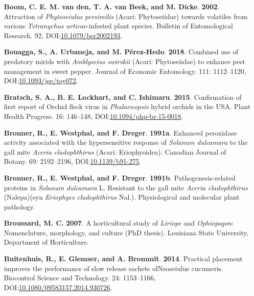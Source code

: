 \documentclass[12pt,final,CPage]{ufthesis}
\newlength{\cslhangindent}
\newenvironment{CSLReferences}[2] %
{%
	\setlength{\parindent}{0pt}
	\ifodd #1 \everypar{\setlength{\hangindent}{\cslhangindent}}\ignorespaces\fi
	\ifnum #2 > 0
	\setlength{\parskip}{#2\baselineskip}
	\fi
}%
{}
\begin{document}
{\begin{CSLReferences}{1}{0}
  \leavevmode{}%
  \textbf{Boom, C. E. M. van den, T. A. van Beek, and M. Dicke}. \textbf{2002}. Attraction of {\emph{Phytoseiulus persimilis}} ({Acari}: {Phytoseiidae}) towards volatiles from various {\emph{Tetranychus urticae}}-infested plant species. Bulletin of Entomological Research. 92, DOI:\href{https://doi.org/10.1079/ber2002193}{10.1079/ber2002193}.

  \leavevmode{}%
  \textbf{Bouagga, S., A. Urbaneja, and M. Pérez-Hedo}. \textbf{2018}. Combined use of predatory mirids with {\emph{Amblyseius swirskii}} ({Acari}: {Phytoseiidae}) to enhance pest management in sweet pepper. Journal of Economic Entomology. 111: 1112--1120, DOI:\href{https://doi.org/10.1093/jee/toy072}{10.1093/jee/toy072}.

  \leavevmode{}%
  \textbf{Bratsch, S. A., B. E. Lockhart, and C. Ishimaru}. \textbf{2015}. Confirmation of first report of {Orchid fleck virus} in {\emph{Phalaenopsis}} hybrid orchids in the {USA}. Plant Health Progress. 16: 146--148, DOI:\href{https://doi.org/10.1094/php-br-15-0018}{10.1094/php-br-15-0018}.

  \leavevmode{}%
  \textbf{Bronner, R., E. Westphal, and F. Dreger}. \textbf{1991a}. Enhanced peroxidase activity associated with the hypersensitive response of {\emph{Solanum dulcamara}} to the gall mite {\emph{Aceria cladophthirus}} ({Acari}: {Eriophyoidea}). Canadian Journal of Botany. 69: 2192--2196, DOI:\href{https://doi.org/10.1139/b91-275}{10.1139/b91-275}.

  \leavevmode{}%
  \textbf{Bronner, R., E. Westphal, and F. Dreger}. \textbf{1991b}. Pathogenesis-related proteins in {\emph{Solanum dulcamara}} {L.} Resistant to the gall mite {\emph{Aceria cladophthirus}} ({Nalepa})(syn {\emph{Eriophyes cladophthirus}} {Nal.}). Physiological and molecular plant pathology.

  \leavevmode{}%
  \textbf{Broussard, M. C.} \textbf{2007}. A horticultural study of {\emph{Liriope}} and {\emph{Ophiopogon}}: Nomenclature, morphology, and culture (PhD thesis). Louisiana State University, Department of Horticulture.

  \leavevmode{}%
  \textbf{Buitenhuis, R., E. Glemser, and A. Brommit}. \textbf{2014}. Practical placement improves the performance of slow release sachets {ofNeoseiulus} cucumeris. Biocontrol Science and Technology. 24: 1153--1166, DOI:\href{https://doi.org/10.1080/09583157.2014.930726}{10.1080/09583157.2014.930726}.


\end{CSLReferences}}
\end{document}
